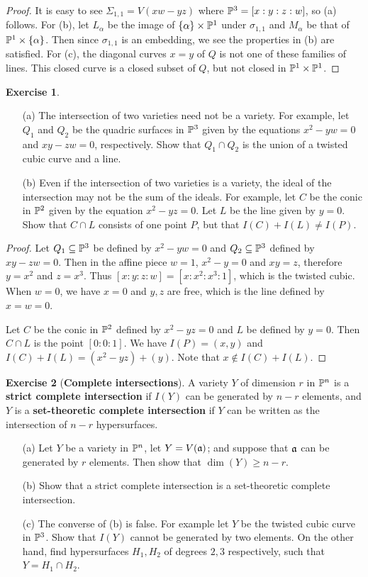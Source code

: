 \documentclass[11pt]{book}
\theoremstyle{definition}
\newtheorem{exercise}{Exercise}[section]
\begin{document}
\begin{proof}
It is easy to see $\Sigma_{1,1}=V(xw-yz)$ where $\P^3=[x:y:z:w]$, so (a) follows. For (b), let $L_\alpha$ be the image of $\{\alpha\}\times\P^1$ under $\sigma_{1,1}$ and $M_\alpha$ be that of $\P^1\times\{\alpha\}$. Then since $\sigma_{1,1}$ is an embedding, we see the properties in (b) are satisfied. For (c), the diagonal curves $x=y$ of $Q$ is not one of these families of lines. This closed curve is a closed subset of $Q$, but not closed in $\P^1\times\P^1$.
\end{proof}
\begin{exercise}
\mbox{}
\begin{itemize}
\item[(a)] The intersection of two varieties need not be a variety. For example, let $Q_1$ and $Q_2$ be the quadric surfaces in $\P^3$ given by the equations $x^2-yw=0$ and $xy-zw=0$, respectively. Show that $Q_1\cap Q_2$ is the union of a twisted cubic curve and a line.
\item[(b)] Even if the intersection of two varieties is a variety, the ideal of the intersection may not be the sum of the ideals. For example, let $C$ be the conic in $\P^2$ given by the equation $x^2-yz=0$. Let $L$ be the line given by $y=0$. Show that $C\cap L$ consists of one point $P$, but that $I(C)+I(L)\neq I(P)$.
\end{itemize}
\end{exercise}
\begin{proof}
Let $Q_1\sub\P^3$ be defined by $x^2-yw=0$ and $Q_2\sub\P^3$ defined by $xy-zw=0$. Then in the affine piece $w=1$, $x^2-y=0$ and $xy=z$, therefore $y=x^2$ and $z=x^3$. Thus $[x:y:z:w]=[x:x^2:x^3:1]$, which is the twisted cubic. When $w=0$, we have $x=0$ and $y,z$ are free, which is the line defined by $x=w=0$.\par
Let $C$ be the conic in $\P^2$ defined by $x^2-yz=0$ and $L$ be defined by $y=0$. Then $C\cap L$ is the point $[0:0:1]$. We have $I(P)=(x,y)$ and $I(C)+I(L)=(x^2-yz)+(y)$. Note that $x\notin I(C)+I(L)$.
\end{proof}
\begin{exercise}[\textbf{Complete intersections}]
A variety $Y$ of dimension $r$ in $\P^n$ is a \textbf{strict complete intersection} if $I(Y)$ can be generated by $n-r$ elements, and $Y$ is a \textbf{set-theoretic complete intersection} if $Y$ can be written as the intersection of $n-r$ hypersurfaces.
\begin{itemize}
\item[(a)] Let $Y$ be a variety in $\P^n$, let $Y=V(\a)$; and suppose that $\a$ can be generated by $r$ elements. Then show that $\dim(Y)\geq n-r$.
\item[(b)] Show that a strict complete intersection is a set-theoretic complete intersection.
\item[(c)] The converse of (b) is false. For example let $Y$ be the twisted cubic curve in $\P^3$. Show that $I(Y)$ cannot be generated by two elements. On the other hand, find hypersurfaces $H_1,H_2$ of degrees $2,3$ respectively, such that $Y=H_1\cap H_2$. 
\end{itemize}
\end{exercise}
\end{document}

